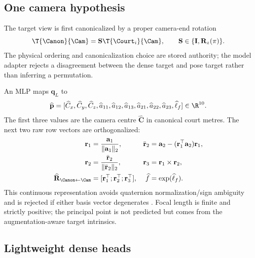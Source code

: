 \subsection{One camera hypothesis}
\label{sec:pose10d}

The target view is first canonicalized by a proper camera-end rotation
\begin{equation}
  \T{\Canon}{\Cam}=\mathbf{S}\T{\Court_i}{\Cam},
  \qquad \mathbf{S}\in\{\mathbf{I},\mathbf{R}_z(\pi)\}.
  \label{eq:canonical_pose}
\end{equation}
The physical \KP ordering and canonicalization choice are stored authority;
the model adapter rejects a disagreement between the dense target and pose
target rather than inferring a permutation.

An MLP maps \(\mathbf{q}_L\) to
\begin{equation}
  \widehat{\mathbf{p}}=
  [\widehat C_x,\widehat C_y,\widehat C_z,
   \widehat a_{11},\widehat a_{12},\widehat a_{13},
   \widehat a_{21},\widehat a_{22},\widehat a_{23},
   \widehat\ell_f]\in\R^{10}.
  \label{eq:pose10d}
\end{equation}
The first three values are the camera centre \(\widehat{\mathbf{C}}\) in
canonical court metres.  The next two raw row vectors are orthogonalized:
\begin{align}
  \mathbf{r}_1&=\frac{\mathbf{a}_1}{\|\mathbf{a}_1\|_2}, &
  \bar{\mathbf{r}}_2&=\mathbf{a}_2-
      (\mathbf{r}_1^{\top}\mathbf{a}_2)\mathbf{r}_1, \\
  \mathbf{r}_2&=\frac{\bar{\mathbf{r}}_2}{\|\bar{\mathbf{r}}_2\|_2}, &
  \mathbf{r}_3&=\mathbf{r}_1\times\mathbf{r}_2, \\
  \widehat{\mathbf{R}}_{\Canon\leftarrow\Cam}
    &= [\mathbf{r}_1^{\top};\mathbf{r}_2^{\top};\mathbf{r}_3^{\top}], &
  \widehat f&=\exp(\widehat\ell_f).
  \label{eq:rotation_decode}
\end{align}
This continuous representation avoids quaternion normalization/sign ambiguity
and is rejected if either basis vector degenerates
\citep{zhou2019continuity}.  Focal length is finite and strictly positive; the
principal point is not predicted but comes from the augmentation-aware target
intrinsics.

\subsection{Lightweight dense heads}

